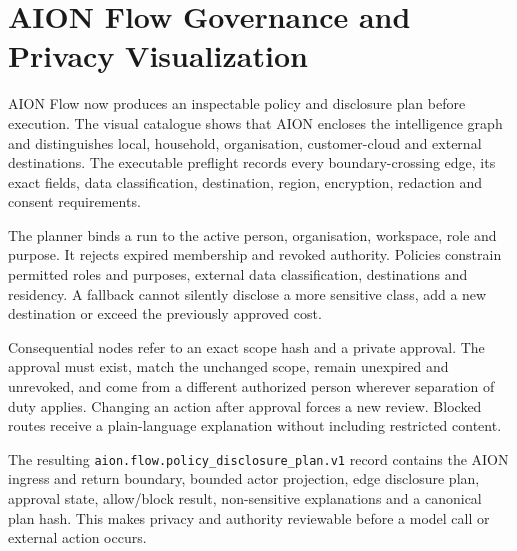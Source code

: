 \section{AION Flow Governance and Privacy Visualization}
\label{sec:aion-flow-governance}

AION Flow now produces an inspectable policy and disclosure plan before execution.  The visual
catalogue shows that AION encloses the intelligence graph and distinguishes local, household,
organisation, customer-cloud and external destinations.  The executable preflight records every
boundary-crossing edge, its exact fields, data classification, destination, region, encryption,
redaction and consent requirements.

The planner binds a run to the active person, organisation, workspace, role and purpose.  It rejects
expired membership and revoked authority.  Policies constrain permitted roles and purposes,
external data classification, destinations and residency.  A fallback cannot silently disclose a
more sensitive class, add a new destination or exceed the previously approved cost.

Consequential nodes refer to an exact scope hash and a private approval.  The approval must exist,
match the unchanged scope, remain unexpired and unrevoked, and come from a different authorized
person wherever separation of duty applies.  Changing an action after approval forces a new review.
Blocked routes receive a plain-language explanation without including restricted content.

The resulting \texttt{aion.flow.policy\_disclosure\_plan.v1} record contains the AION ingress and
return boundary, bounded actor projection, edge disclosure plan, approval state, allow/block result,
non-sensitive explanations and a canonical plan hash.  This makes privacy and authority reviewable
before a model call or external action occurs.
